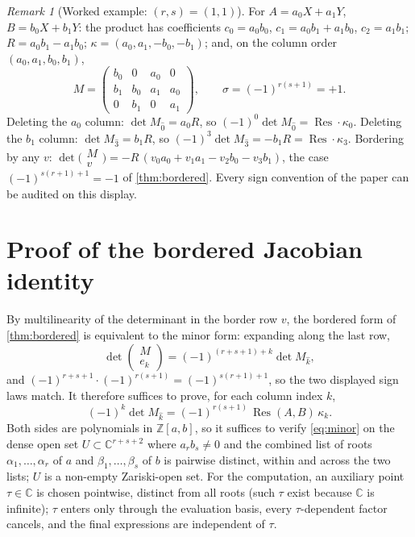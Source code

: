 \documentclass[11pt,reqno]{amsart}
\theoremstyle{definition}
\theoremstyle{remark}
\newtheorem{remark}[remark]{Remark}
\newcommand{\C}{\mathbb C}
\newcommand{\Z}{\mathbb Z}
\newcommand{\Res}{\operatorname{Res}}
\begin{document}
\begin{remark}[Worked example: $(r,s)=(1,1)$]\label{ex:11}
For $A=a_0X+a_1Y$, $B=b_0X+b_1Y$: the product has coefficients
$c_0=a_0b_0$, $c_1=a_0b_1+a_1b_0$, $c_2=a_1b_1$;
$R=a_0b_1-a_1b_0$; $\kappa=(a_0,a_1,-b_0,-b_1)$; and, on the
column order $(a_0,a_1,b_0,b_1)$,
\[
 M=\begin{pmatrix}
 b_0&0&a_0&0\\
 b_1&b_0&a_1&a_0\\
 0&b_1&0&a_1
 \end{pmatrix},
 \qquad \sigma=(-1)^{r(s+1)}=+1 .
\]
Deleting the $a_0$ column: $\det M_{\hat0}=a_0R$, so
$(-1)^0\det M_{\hat0}=\Res\cdot\kappa_0$.  Deleting the
$b_1$ column: $\det M_{\hat3}=b_1R$, so
$(-1)^3\det M_{\hat3}=-b_1R=\Res\cdot\kappa_3$.  Bordering by any
$v$:
$\det\bigl(\begin{smallmatrix}M\\v\end{smallmatrix}\bigr)
=-R\,(v_0a_0+v_1a_1-v_2b_0-v_3b_1)$, the case
$(-1)^{s(r+1)+1}=-1$ of \cref{thm:bordered}.  Every sign convention
of the paper can be audited on this display.
\end{remark}

\section{Proof of the bordered Jacobian identity}\label{sec:proof}

By multilinearity of the determinant in the border row $v$, the
bordered form of \cref{thm:bordered} is equivalent to the minor form:
expanding along the last row,
\[
 \det\begin{pmatrix}M\\e_k\end{pmatrix}
 =(-1)^{(r+s+1)+k}\det M_{\hat k},
\]
and $(-1)^{r+s+1}\cdot(-1)^{r(s+1)}=(-1)^{s(r+1)+1}$, so the two
displayed sign laws match.  It therefore suffices to prove, for each
column index $k$,
\begin{equation}\label{eq:minor}
 (-1)^k\det M_{\hat k}=(-1)^{r(s+1)}\,\Res(A,B)\,\kappa_k .
\end{equation}
Both sides are polynomials in $\Z[a,b]$, so it suffices to verify
\eqref{eq:minor} on the dense open set
$U\subset\C^{r+s+2}$ where $a_rb_s\ne0$ and the combined list of
roots $\alpha_1,\dots,\alpha_r$ of $a$ and $\beta_1,\dots,\beta_s$ of
$b$ is pairwise distinct, within and across the two lists; $U$ is a
non-empty Zariski-open set.  For the computation, an auxiliary point
$\tau\in\C$ is chosen pointwise, distinct from all roots (such
$\tau$ exist because $\C$ is infinite); $\tau$ enters only through
the evaluation basis, every $\tau$-dependent factor cancels, and the
final expressions are independent of $\tau$.
\end{document}
